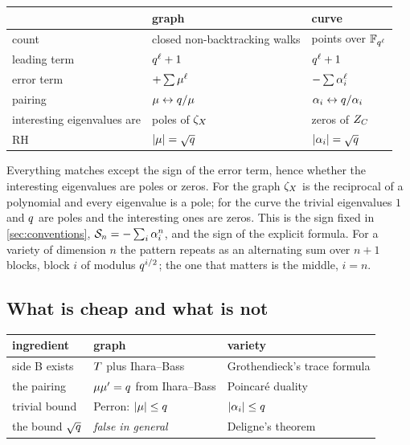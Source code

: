 \begin{center}\begin{tabular}{lll}\toprule
 & graph & curve \\
\midrule
count & closed non-backtracking walks & points over $\mathbb F_{q^{\ell}}$ \\
leading term & $q^{\ell}+1$ & $q^{\ell}+1$ \\
error term & $+\sum\mu^{\ell}$ & $-\sum\alpha_{i}^{\ell}$ \\
pairing & $\mu\leftrightarrow q/\mu$ & $\alpha_{i}\leftrightarrow q/\alpha_{i}$ \\
interesting eigenvalues are & poles of $\zeta_{X}$ & zeros of $Z_C$ \\
RH & $|\mu| = \sqrt{q}$ & $|\alpha_{i}| = \sqrt{q}$ \\
\bottomrule\end{tabular}\end{center}

Everything matches except the sign of the error term, hence whether the interesting eigenvalues are poles or
zeros. For the graph $\zeta_{X}$ is the reciprocal of a polynomial and every eigenvalue is a pole; for the
curve the trivial eigenvalues $1$ and $q$ are poles and the interesting ones are zeros. This is the sign
fixed in \cref{sec:conventions}, $\mathcal S_{n} = -\sum_i\alpha_{i}^n$, and the sign of the explicit formula.
For a variety of dimension $n$ the pattern repeats as an alternating sum over $n+1$ blocks, block $i$ of
modulus $q^{i/2}$; the one that matters is the middle, $i=n$.

\subsection{What is cheap and what is not}

\begin{center}\begin{tabular}{lll}\toprule
ingredient & graph & variety \\
\midrule
side B exists & $T$ plus Ihara--Bass & Grothendieck's trace formula \\
the pairing & $\mu\mu' = q$ from Ihara--Bass & Poincar\'e duality \\
trivial bound & Perron: $|\mu|\le q$ & $|\alpha_{i}|\le q$ \\
the bound $\sqrt{q}$ & \emph{false in general} & Deligne's theorem \\
\bottomrule\end{tabular}\end{center}

